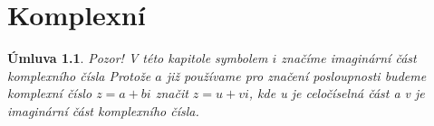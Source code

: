 \documentclass[12pt]{book}
\newtheorem{definice}{Definice}
\newtheorem*{pr}{Příklad}
\newtheorem*{umluva}{Úmluva}
\begin{document}











\chapter{Komplexní}

\begin{umluva}
	Pozor! V této kapitole symbolem $i$ značíme imaginární část komplexního čísla\newline
	Protože $a$ již používame pro značení posloupnosti budeme komplexní číslo $z = a +bi$ značit $z=u+vi$, kde u je celočíselná část a v je imaginární část komplexního čísla.
	\end{umluva}
\end{document}

